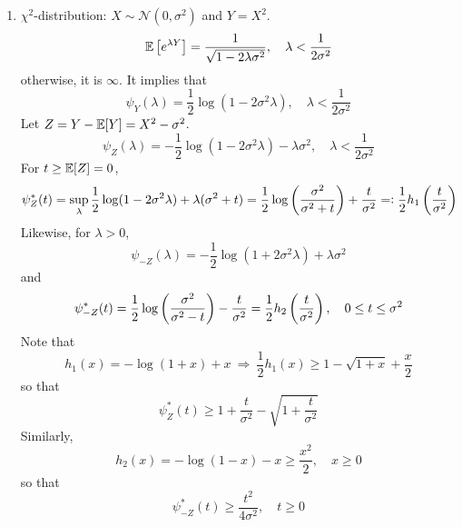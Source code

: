 \begin{enumerate}[label=\arabic{*}.]
\begin{exam}
\begin{enumerate}[label=(\arabic{*})]
	    	\item  $\chi^2$-distribution: $X \sim \mathcal{N}(0,\sigma^2)$ and $Y = X^2$.
	    	\begin{equation*}
	    	    \mathbb{E}\left[e^{\lambda Y}\right] = \frac{1}{\sqrt{1 - 2\lambda \sigma^2}},\quad \lambda < \frac{1}{2\sigma^2}
	    	\end{equation*}
	    	otherwise, it is $\infty$. It implies that
	    	\begin{equation*}
	    		\psi_Y(\lambda) = \frac{1}{2}\log (1 - 2\sigma^2\lambda),\quad \lambda < \frac{1}{2\sigma^2}
	    	\end{equation*}
	    	Let $Z = Y - \mathbb{E}[Y] = X^2 - \sigma^2$.
	    	\begin{equation*}
	    		\psi_Z(\lambda) = -\frac{1}{2}\log(1 - 2\sigma^2\lambda) - \lambda \sigma^2,\quad \lambda < \frac{1}{2\sigma^2}
	    	\end{equation*}
	    	For $t \geq \mathbb{E}[Z] = 0$,
	    	\begin{equation*}
	    		\psi^*_Z(t) = \sup_\lambda \frac{1}{2} \log(1 - 2\sigma^2\lambda) + \lambda(\sigma^2 + t) = \frac{1}{2} \log \left(\frac{\sigma^2}{\sigma^2 + t}\right) + \frac{t}{\sigma^2} =\vcentcolon \frac{1}{2}h_1\left(\frac{t}{\sigma^2}\right)
	    	\end{equation*}
	    	Likewise, for $\lambda > 0$,
	    	\begin{equation*}
	    	   \psi_{-Z}(\lambda) = -\frac{1}{2}\log(1 + 2\sigma^2\lambda) + \lambda \sigma^2
	    	\end{equation*}
	    	and
	    	\begin{equation*}
	    		\psi^*_{-Z}(t) = \frac{1}{2} \log \left(\frac{\sigma^2}{\sigma^2 - t}\right) - \frac{t}{\sigma^2} = \frac{1}{2}h_2\left(\frac{t}{\sigma^2}\right),\quad 0 \leq t \leq \sigma^2
	    	\end{equation*}
	    	Note that
	    	\begin{equation*}
	    	    h_1(x) = -\log (1+x) +x ~\Rightarrow~ \frac{1}{2}h_1(x) \geq 1 - \sqrt{1+x} + \frac{x}{2}
	    	\end{equation*}
	    	so that
	    	\begin{equation*}
	    	    \psi^*_Z(t) \geq 1+\frac{t}{\sigma^2} - \sqrt{1 + \frac{t}{\sigma^2}}
	    	\end{equation*}
	    	Similarly,
	    	\begin{equation*}
	    		h_2(x) = -\log(1 - x)-x \geq \frac{x^2}{2},\quad x \geq 0
	    	\end{equation*}
	    	so that
	    	\begin{equation*}
	    	    \psi^*_{-Z}(t) \geq \frac{t^2}{4\sigma^2},\quad t \geq 0
	    	\end{equation*}
	    \end{enumerate}
	\end{exam}

\end{enumerate}


